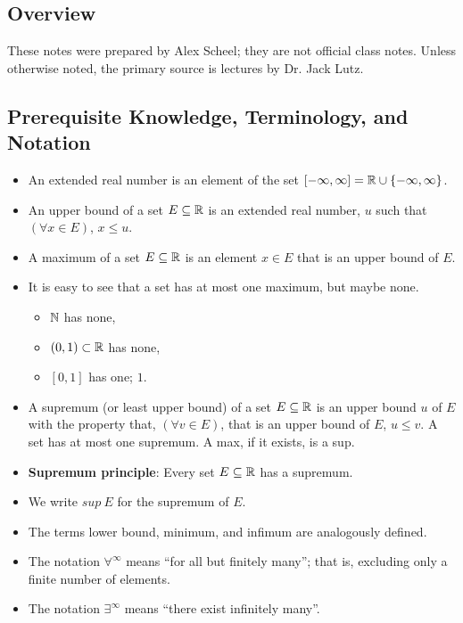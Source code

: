 \documentclass[../main.tex]{subfiles}
\begin{document}
\subsection{Overview}
These notes were prepared by Alex Scheel; they are not official class notes.
Unless otherwise noted, the primary source is lectures by Dr. Jack Lutz.

\subsection{Prerequisite Knowledge, Terminology, and Notation}

\begin{itemize}
    \item An extended real number is an element of the set
        $[-\infty, \infty] = \mathbb{R} \cup \{ -\infty, \infty \}$.
    \item An upper bound of a set $E \subseteq \mathbb{R}$ is an extended
        real number, $u$ such that $(\forall x \in E)$, $x \leq u$.
    \item A maximum of a set $E \subseteq \mathbb{R}$ is an element $x \in E$ that is
        an upper bound of $E$.
    \item It is easy to see that a set has at most one maximum, but maybe none.
        \begin{itemize}
            \item $\mathbb{N}$ has none,
            \item $(0, 1) \subset \mathbb{R}$ has none,
            \item $[0, 1]$ has one; $1$.
        \end{itemize}
    \item A supremum (or least upper bound) of a set $E \subseteq \mathbb{R}$ is an
        upper bound $u$ of $E$ with the property that, $(\forall v \in E)$,
        that is an upper bound of $E$, $u \leq v$. A set has at most one supremum.
        A max, if it exists, is a sup.
    \item \textbf{Supremum principle}: Every set $E \subseteq \mathbb{R}$ has a supremum.
    \item We write $sup\ E$ for the supremum of $E$.
    \item The terms lower bound, minimum, and infimum are analogously defined.
    \item The notation $\forall^{\infty}$ means ``for all but finitely many''; that is,
        excluding only a finite number of elements.
    \item The notation $\exists^{\infty}$ means ``there exist infinitely many''.
\end{itemize}
\end{document}
